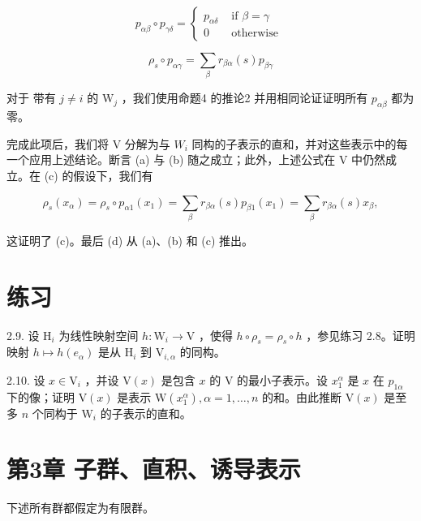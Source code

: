 \documentclass[10pt]{article}
\begin{document}
\[
{p}_{\alpha \beta } \circ  {p}_{\gamma \delta } = \left\{  \begin{array}{ll} {p}_{\alpha \delta } & \text{ if }\beta  = \gamma \\  0 & \text{ otherwise } \end{array}\right.
\]

\[
{\rho }_{s} \circ  {p}_{\alpha \gamma } = \mathop{\sum }\limits_{\beta }{r}_{\beta \alpha }\left( s\right) {p}_{\beta \gamma }
\]

对于 带有 \(j \neq  i\) 的 \({\mathrm{W}}_{j}\) ，我们使用命题4 的推论2 并用相同论证证明所有 \({p}_{\alpha \beta }\) 都为零。

完成此项后，我们将 V 分解为与 \({W}_{i}\) 同构的子表示的直和，并对这些表示中的每一个应用上述结论。断言 (a) 与 (b) 随之成立；此外，上述公式在 V 中仍然成立。在 (c) 的假设下，我们有

\[
{\rho }_{s}\left( {x}_{\alpha }\right)  = {\rho }_{s} \circ  {p}_{\alpha 1}\left( {x}_{1}\right)  = \mathop{\sum }\limits_{\beta }{r}_{\beta \alpha }\left( s\right) {p}_{\beta 1}\left( {x}_{1}\right)  = \mathop{\sum }\limits_{\beta }{r}_{\beta \alpha }\left( s\right) {x}_{\beta },
\]

这证明了 (c)。最后 (d) 从 (a)、(b) 和 (c) 推出。

\section*{练习}

2.9. 设 \({\mathrm{H}}_{i}\) 为线性映射空间 \(h : {\mathrm{W}}_{i} \rightarrow  \mathrm{V}\) ，使得 \(h \circ  {\rho }_{s} = {\rho }_{s} \circ  h\) ，参见练习 2.8。证明映射 \(h \mapsto  h\left( {e}_{\alpha }\right)\) 是从 \({\mathrm{H}}_{i}\) 到 \({\mathrm{V}}_{i,\alpha }\) 的同构。

2.10. 设 \(x \in  {\mathrm{V}}_{i}\) ，并设 \(\mathrm{V}\left( x\right)\) 是包含 \(x\) 的 \(\mathrm{V}\) 的最小子表示。设 \({x}_{1}^{\alpha }\) 是 \(x\) 在 \({p}_{1\alpha }\) 下的像；证明 \(\mathrm{V}\left( x\right)\) 是表示 \(\mathrm{W}\left( {x}_{1}^{\alpha }\right) ,\alpha  = 1,\ldots ,n\) 的和。由此推断 \(\mathrm{V}\left( x\right)\) 是至多 \(n\) 个同构于 \({\mathrm{W}}_{i}\) 的子表示的直和。

\section*{第3章 子群、直积、诱导表示}

下述所有群都假定为有限群。
\end{document}
